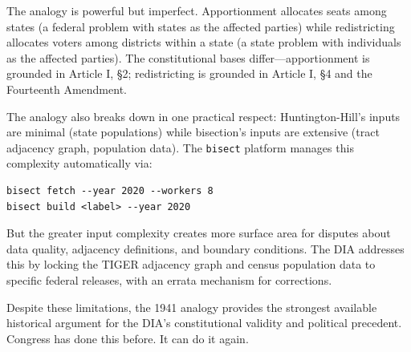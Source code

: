 The analogy is powerful but imperfect. Apportionment allocates seats among states (a federal problem with states as the affected parties) while redistricting allocates voters among districts within a state (a state problem with individuals as the affected parties). The constitutional bases differ---apportionment is grounded in Article I, \S2; redistricting is grounded in Article I, \S4 and the Fourteenth Amendment.

The analogy also breaks down in one practical respect: Huntington-Hill's inputs are minimal (state populations) while bisection's inputs are extensive (tract adjacency graph, population data). The \texttt{bisect} platform manages this complexity automatically via:
\begin{verbatim}
bisect fetch --year 2020 --workers 8
bisect build <label> --year 2020
\end{verbatim}
But the greater input complexity creates more surface area for disputes about data quality, adjacency definitions, and boundary conditions. The DIA addresses this by locking the TIGER adjacency graph and census population data to specific federal releases, with an errata mechanism for corrections.

Despite these limitations, the 1941 analogy provides the strongest available historical argument for the DIA's constitutional validity and political precedent. Congress has done this before. It can do it again.
